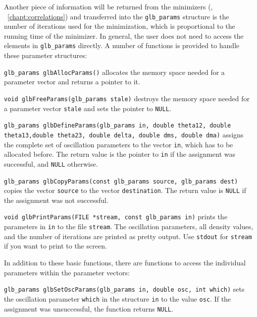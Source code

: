 Another piece of information will be returned from the minimizers 
(\cf, \Chapt~\ref{chapt:correlations}) and transferred
into the {\tt glb\_params} structure is the number
of iterations used for the minimization, which is proportional to the
running time of the minimizer. In general, the user does not need to
access the elements in {\tt glb\_params} directly. A number of functions
is provided to handle these parameter structures:
\begin{function}
{\tt glb\_params glbAllocParams()} allocates the memory space
needed for a parameter vector and returns a pointer to it.
\end{function}
\begin{function}
{\tt void glbFreeParams(glb\_params stale)} destroys the memory space
needed for a parameter vector {\tt stale} and sets the pointer to {\tt NULL}.
\end{function}
\begin{function}
{\tt glb\_params glbDefineParams(glb\_params in, double theta12, double theta13,double theta23, double delta, double dms, double dma)} assigns
the complete set of oscillation parameters to the vector {\tt in}, which has
to be allocated before. The return value is the pointer to {\tt in} if 
the assignment was successful, and {\tt NULL} otherwise.
\end{function}
\begin{function}
 {\tt glb\_params glbCopyParams(const glb\_params source, glb\_params dest)}
 copies the vector {\tt source} to the vector {\tt destination}. The return
 value is {\tt NULL} if the assignment was not successful.
\end{function}
\begin{function}
{\tt void glbPrintParams(FILE *stream, const glb\_params in)} prints the
parameters in {\tt in} to the file {\tt stream}. The oscillation
parameters, all density values, and the number of iterations are
printed as pretty output. Use {\tt stdout} for {\tt stream} if you want
to print to the screen.
\end{function}
In addition to these basic functions, there are functions to access
the individual parameters within the parameter vectors:
\begin{function}
{\tt glb\_params glbSetOscParams(glb\_params in, double osc, int which)}
sets the oscillation parameter {\tt which} in the structure {\tt in}
to the value {\tt osc}. If the assignment was unsuccessful, the 
function returns {\tt NULL}.
\end{function}
